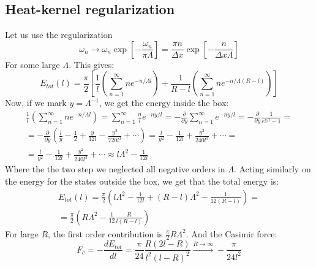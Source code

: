 \documentclass{article}
\begin{document}
\subsection{Heat-kernel regularization}
Let us use the regularization
\begin{equation}
    \omega_n \rightarrow \omega_n \exp[-\frac{\omega_n}{\pi \Lambda}] = \frac{\pi n}{\Delta x}\exp[-\frac{n}{\Delta x \Lambda}]
\end{equation}
For some large $\Lambda$. This gives:
\begin{equation}
    E_{tot}(l) = \frac{\pi}{2}\left[
        \frac{1}{l}\left(\sum_{n=1}^\infty n e^{-n/\Lambda l}\right) +
        \frac{1}{R - l}\left(\sum_{n=1}^\infty n e^{-n/\Lambda (R - l)}\right)\right]
\end{equation}
Now, if we mark $y = \Lambda^{-1}$, we get the energy inside the box:
\begin{equation}
\begin{gathered}
    \frac{1}{l}\left(\sum_{n=1}^\infty n e^{-n/\Lambda l}\right) =
    \sum_{n=1}^\infty \frac{n}{l} e^{-ny/l} =
    -\frac{\partial}{\partial y}\sum_{n=1}^\infty e^{-ny/l} =
    -\frac{\partial}{\partial y} \frac{1}{e^{y/l} - 1} = \\ =
    -\frac{\partial}{\partial y} \left(\frac{l}{y} - \frac{1}{2} + \frac{y}{12l} - \frac{y^3}{720l^3} + \cdots\right) =
    \frac{l}{y^2} - \frac{1}{12l} + \frac{y^2}{240l^3} + \cdots = \\ =
    \frac{l}{y^2} - \frac{1}{12l} + \frac{y^2}{240l^3} + \cdots \approx
    l\Lambda^2 - \frac{1}{12l}
\end{gathered}
\end{equation}
Where the the two step we neglected all negative orders in $\Lambda$. Acting similarly on the energy for the states outside the box, we get that the total energy is:
\begin{equation}
\begin{gathered}
    E_{tot}(l) = \frac{\pi}{2}\left(l\Lambda^2 - \frac{1}{12l} + (R - l)
    \Lambda^2 - \frac{1}{12(R - l)}\right) = \\ =
    \frac{\pi}{2}\left(R\Lambda^2 - \frac{1}{12} \frac{R}{l(R - l)}\right)
\end{gathered}
\end{equation}
For large $R$, the first order contribution is $\frac{\pi}{2}R\Lambda^2$.
And the Casimir force:
\begin{equation}
    F_c = -\frac{d E_{tot}}{dl} = \frac{\pi}{24}\frac{R(2l - R)}{l^2(l - R)^2} \xrightarrow{R \rightarrow \infty} - \frac{\pi}{24l^2}
\end{equation}
\end{document}

